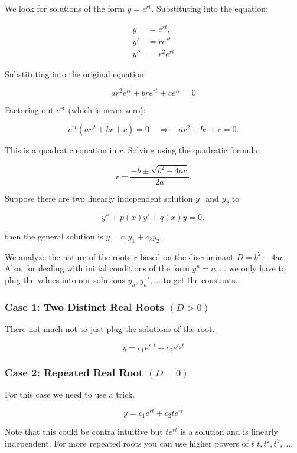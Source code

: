We look for solutions of the form \( y = e^{rt} \). Substituting into the equation:

\begin{align*}
    y &= e^{rt}, \\
    y' &= r e^{rt} \\
    y'' &=  r^2 e^{rt}
\end{align*}


Substituting into the original equation:

\[
    ar^2 e^{rt} + bre^{rt} + ce^{rt} = 0
\]

Factoring out \( e^{rt} \) (which is never zero):

\[
    e^{rt}(ar^2 + br + c) = 0 \quad \Rightarrow \quad ar^2 + br + c = 0.
\]

This is a quadratic equation in \( r \). Solving using the quadratic formula:

\[
    r = \frac{-b \pm \sqrt{b^2 - 4ac}}{2a}.
\]

Suppose there are two linearly independent solution \(y_1\) and \(y_2\) to

\[
    y'' + p(x)y' + q(x)y = 0,
\]

then the general solution is \(y = c_1 y_1 + c_2 y_2\).
\vspace{\baselineskip}

We analyze the nature of the roots \( r \) based on the discriminant \( D = b^2 - 4ac \).
Also, for dealing with initial conditions of the form \(y^n = a, \dots\) we only have to 
plug the values into our solutions \(y_h, y_{h}', \dots \) to get the constants.

\subsubsection{Case 1: Two Distinct Real Roots \texorpdfstring{\( (D > 0) \)}{}}

There not much not to just plug the solutions of the root.

\[
    y = c_1 e^{r_1 t} + c_2 e^{r_2 t}
\]

\subsubsection{Case 2: Repeated Real Root \texorpdfstring{\( (D = 0) \)}{}}

For this case we need to use a trick.

\[
    y = c_1 e^{rt} + c_2 te^{rt}
\]

Note that this could be contra intuitive but \(te^{rt}\) is a solution and is linearly independent.
For more repeated roots you can use higher powers of \(t\) \(t, t^2, t^3, \dots\).

